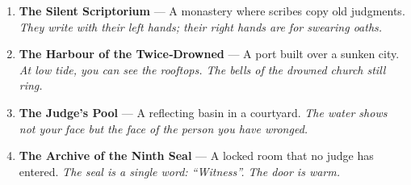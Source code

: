 \documentclass[11pt]{book}
\begin{document}
\begin{enumerate}
\item[J] \textbf{The Silent Scriptorium} — A monastery where scribes copy old judgments. \textit{They write with their left hands; their right hands are for swearing oaths.}
\item[Q] \textbf{The Harbour of the Twice‑Drowned} — A port built over a sunken city. \textit{At low tide, you can see the rooftops. The bells of the drowned church still ring.}
\item[K] \textbf{The Judge’s Pool} — A reflecting basin in a courtyard. \textit{The water shows not your face but the face of the person you have wronged.}
\item[A] \textbf{The Archive of the Ninth Seal} — A locked room that no judge has entered. \textit{The seal is a single word: “Witness”. The door is warm.}
\end{enumerate}
\end{document}
